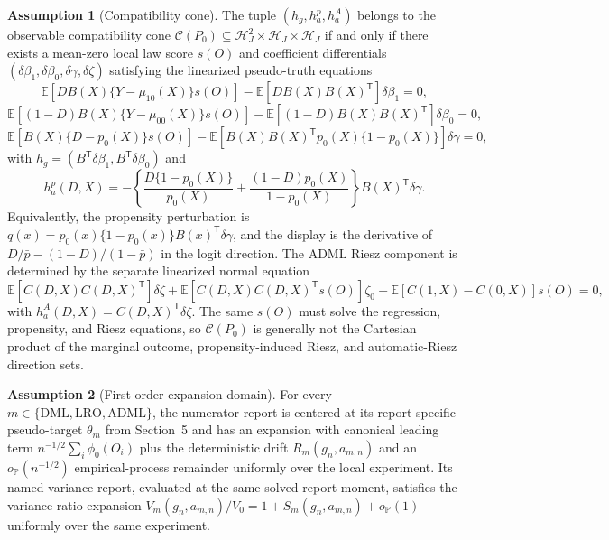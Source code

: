\documentclass[11pt]{article}
\newcommand{\E}{\mathbb{E}}
\renewcommand{\Pr}{\mathbb{P}}
\newcommand{\transpose}{\mathsf{T}}
\theoremstyle{definition}
\newtheorem{assumption}{Assumption}
\theoremstyle{plain}
\theoremstyle{remark}
\begin{document}
\begin{assumption}[Compatibility cone]\label{ass:compatibility}
The tuple \((h_g,h^p_a,h^A_a)\) belongs to the observable compatibility cone \(\mathcal C(P_0)\subseteq\mathcal H_J^2\times\mathcal H_J\times\mathcal H_J\) if and only if there exists a mean-zero local law score \(s(O)\) and coefficient differentials \((\delta\beta_1,\delta\beta_0,\delta\gamma,\delta\zeta)\) satisfying the linearized pseudo-truth equations
\[
\E[D B(X)\{Y-\mu_{10}(X)\}s(O)]-\E[D B(X)B(X)^\transpose]\delta\beta_1=0,
\]
\[
\E[(1-D) B(X)\{Y-\mu_{00}(X)\}s(O)]-\E[(1-D) B(X)B(X)^\transpose]\delta\beta_0=0,
\]
\[
\E[B(X)\{D-p_0(X)\}s(O)]-\E[B(X)B(X)^\transpose p_0(X)\{1-p_0(X)\}]\delta\gamma=0,
\]
with \(h_g=(B^\transpose\delta\beta_1,B^\transpose\delta\beta_0)\) and
\[
h^p_a(D,X)=
-\left\{\frac{D\{1-p_0(X)\}}{p_0(X)}+\frac{(1-D)p_0(X)}{1-p_0(X)}\right\}
B(X)^\transpose\delta\gamma .
\]
Equivalently, the propensity perturbation is \(q(x)=p_0(x)\{1-p_0(x)\}B(x)^\transpose\delta\gamma\), and the display is the derivative of \(D/\bar p-(1-D)/(1-\bar p)\) in the logit direction.  The ADML Riesz component is determined by the separate linearized normal equation
\[
\E[C(D,X)C(D,X)^\transpose]\delta\zeta
+\E[C(D,X)C(D,X)^\transpose s(O)]\zeta_0-\E[C(1,X)-C(0,X)]s(O)=0,
\]
with \(h^A_a(D,X)=C(D,X)^\transpose\delta\zeta\).  The same \(s(O)\) must solve the regression, propensity, and Riesz equations, so \(\mathcal C(P_0)\) is generally not the Cartesian product of the marginal outcome, propensity-induced Riesz, and automatic-Riesz direction sets.
\end{assumption}

\begin{assumption}[First-order expansion domain]\label{ass:expansion-domain}
For every \(m\in\{\mathrm{DML},\mathrm{LRO},\mathrm{ADML}\}\), the numerator report is centered at its report-specific pseudo-target \(\theta_m\) from Section~5 and has an expansion with canonical leading term \(n^{-1/2}\sum_i\phi_0(O_i)\) plus the deterministic drift \(R_m(g_n,a_{m,n})\) and an \(o_{\Pr}(n^{-1/2})\) empirical-process remainder uniformly over the local experiment.  Its named variance report, evaluated at the same solved report moment, satisfies the variance-ratio expansion \(V_m(g_n,a_{m,n})/V_0=1+S_m(g_n,a_{m,n})+o_{\Pr}(1)\) uniformly over the same experiment.
\end{assumption}
\end{document}
